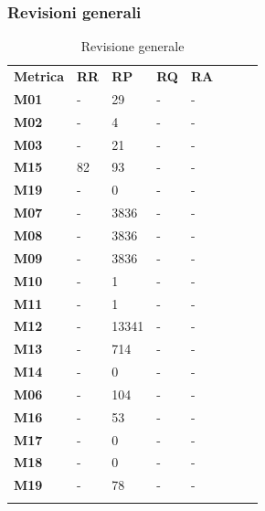 \subsubsection{Revisioni generali}\mbox{}
\begin{longtable} {						
		>{}p{50mm}  		
		>{}p{8mm}		
		>{}p{8mm}		
		>{}p{8mm}		
		>{}p{8mm}		
		>{}p{8mm}		
		>{}p{8mm}
		>{}p{8mm}				
	}			
	\rowcolor{gray!50}
	\textbf{Metrica} & \textbf{RR} & \textbf{RP} & \textbf{RQ} & \textbf{RA} \TBstrut \\ [2mm]
	\textbf{M01} & - & 29 & - & - \TBstrut \\ [2mm]
	\textbf{M02} & - & 4 & - & - \TBstrut \\ [2mm]
	\textbf{M03} & - & 21 & - & - \TBstrut \\ [2mm]
	\textbf{M15} & 82 & 93 & - & - \TBstrut \\ [2mm]
	\textbf{M19} & - & 0 & - & - \TBstrut \\ [2mm]
	\textbf{M07} & - & 3836 & - & - \TBstrut \\ [2mm]
	\textbf{M08} & - & 3836 & - & - \TBstrut \\ [2mm]
	\textbf{M09} & - & 3836 & - & - \TBstrut \\ [2mm]
	\textbf{M10} & - & 1 & - & - \TBstrut \\ [2mm]
	\textbf{M11} & - & 1 & - & - \TBstrut \\ [2mm]
	\textbf{M12} & - & 13341 & - & - \TBstrut \\ [2mm]
	\textbf{M13} & - & 714 & - & - \TBstrut \\ [2mm]
	\textbf{M14} & - & 0 & - & - \TBstrut \\ [2mm]
	\textbf{M06} & - & 104 & - & - \TBstrut \\ [2mm]
	\textbf{M16} & - & 53 & - & - \TBstrut \\ [2mm]
	\textbf{M17} & - & 0 & - & - \TBstrut \\ [2mm]
	\textbf{M18} & - & 0 & - & - \TBstrut \\ [2mm]
	\textbf{M19} & - & 78 & - & - \TBstrut \\ [2mm]
	\rowcolor{white}
	\caption{Revisione generale}
\end{longtable}
